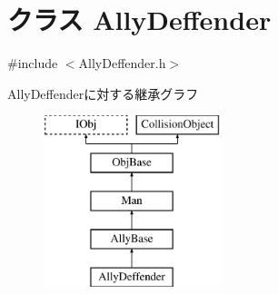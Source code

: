 \hypertarget{class_ally_deffender}{\section{クラス Ally\-Deffender}
\label{class_ally_deffender}
}


{\ttfamily \#include $<$Ally\-Deffender.\-h$>$}

Ally\-Deffenderに対する継承グラフ\begin{figure}[H]
\begin{center}
\leavevmode
\includegraphics[height=5.000000cm]{d0/de6/class_ally_deffender}
\end{center}
\end{figure}
